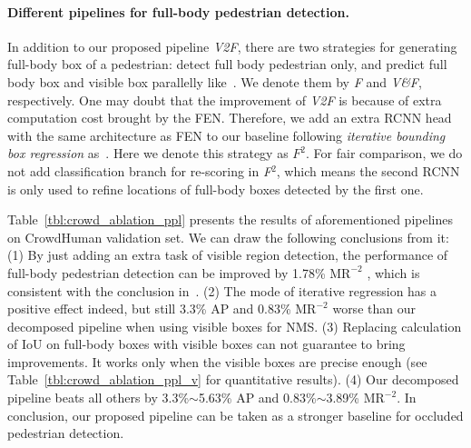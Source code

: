\documentclass[10pt,twocolumn,letterpaper]{article}
\begin{document}
\paragraph{Different pipelines for full-body pedestrian detection.} In addition to our proposed pipeline \emph{V2F}, there are two strategies for generating full-body box of a pedestrian: detect full body pedestrian only, and predict full body box and visible box parallelly like~\cite{Zhou_2018_bibox}. We denote them by \emph{F} and \emph{V\&F}, respectively. One may doubt that the improvement of \emph{V2F} is because of extra computation cost brought by the FEN. Therefore, we add an extra RCNN head with the same architecture as FEN to our baseline following \textit{iterative bounding box regression} as~\cite{gidaris2015object,Gidaris2016Attend}. Here we denote this strategy as \emph{$F^2$}. For fair comparison, we do not add classification branch for re-scoring in \emph{F$^2$}, which means the second RCNN is only used to refine locations of full-body boxes detected by the first one.

Table~\ref{tbl:crowd_ablation_ppl} presents the results of aforementioned pipelines on CrowdHuman validation set. We can draw the following conclusions from it: (1) By just adding an extra task of visible region detection, the performance of full-body pedestrian detection can be improved by 1.78\% $\text{MR}^{-2}$ , which is consistent with the conclusion in~\cite{Zhou_2018_bibox}. (2) The mode of iterative regression has a positive effect indeed, but still 3.3\% AP and 0.83\% $\text{MR}^{-2}$ worse than our decomposed pipeline when using visible boxes for NMS. (3) Replacing calculation of IoU on full-body boxes with visible boxes can not guarantee to bring improvements. It works only when the visible boxes are precise enough (see Table~\ref{tbl:crowd_ablation_ppl_v} for quantitative results). (4) Our decomposed pipeline beats all others by 3.3\%$ \sim $5.63\% AP and 0.83\%$ \sim $3.89\% $\text{MR}^{-2}$. In conclusion, our proposed pipeline can be taken as a stronger baseline for occluded pedestrian detection.
\end{document}
